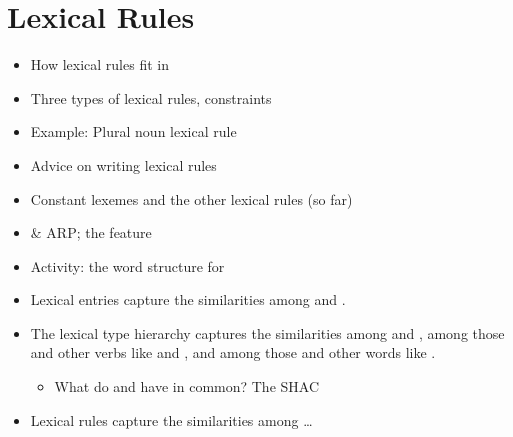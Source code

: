 \documentclass[a4paper,landscape,headrule,footrule]{foils}
\begin{document}
\section{Lexical Rules}

\providecommand{\gry}[1]{{\setlength{\fboxsep}{0pt}\colorbox{lightgray}{\phantom{#1}}}}
\ifdefined\gryA\else\newsavebox{\gryA}\fi
\ifdefined\gryB\else\newsavebox{\gryB}\fi
\ifdefined\gryC\else\newsavebox{\gryC}\fi

\begin{itemize}
\item How lexical rules fit in
\item Three types of lexical rules, constraints
\item Example: Plural noun lexical rule
\item Advice on writing lexical rules
\item Constant lexemes and the other lexical rules (so far)
\item {} \& ARP; the feature 
\item Activity: the word structure for 
\end{itemize}

\begin{itemize}
\item Lexical entries capture the similarities among
   and .
\item The lexical type hierarchy captures the
  similarities among  and ,
  among those and other verbs like 
  and , and among those and other words
  like .
  \begin{itemize}
  \item What do  and  have in common?  The SHAC
  \end{itemize}
\item Lexical rules capture the similarities among
  \ldots
\end{itemize}
\end{document}
